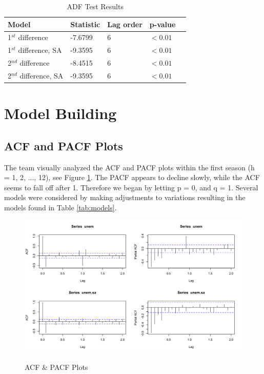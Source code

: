 \documentclass[twoside,twocolumn]{article}
\begin{document}
	 \begin{table}[H]
		 \centering
		 \caption{ADF Test Results}
		 \label{tab:ADF}
		 \begin{tabular}{lllll}
		 \hline
		 \textbf{Model} & \textbf{Statistic} & \textbf{Lag order} & \textbf{p-value}\\ \hline
		 1\(^{st}\) difference &  -7.6799 & 6 & \( < 0.01\)\\
		  1\(^{st}\) difference, SA &  -9.3595 & 6 &\( < 0.01\)\\
		 2\(^{nd}\) difference &  -8.4515 & 6 & \( < 0.01\)\\
		  2\(^{nd}\) difference, SA &  -9.3595 & 6 & \( < 0.01\)\\		 \hline
		 \end{tabular}
		 \end{table}

  



\section{Model Building}

\subsection{ACF and PACF Plots}

 The team visually analyzed the ACF and PACF plots within the first season (h = 1, 2, ..., 12), see Figure \ref{fig:secdiff2}. The PACF appears to decline slowly, while the ACF seems to fall off after 1. Therefore we began by letting p = 0, and q = 1. Several models were considered by making adjustments to variations resulting in the models found in Table \ref{tab:models}.\newline
  
   \begin{figure}[H]
      	\centering
      	\caption{ACF \& PACF Plots}
      	\includegraphics[width=\linewidth]{images/acfpacf}
      	\label{fig:secdiff2}
      \end{figure}
      
\end{document}
